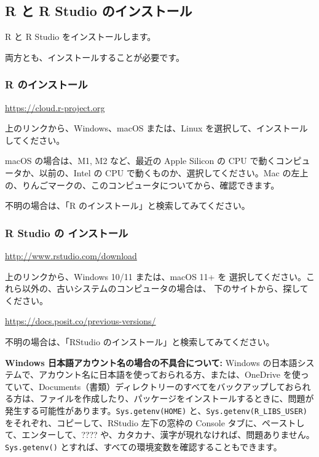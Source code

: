 \documentclass[
]{bxjsbook}
\theoremstyle{definition}
\theoremstyle{definition}
\theoremstyle{definition}
\theoremstyle{definition}
\theoremstyle{remark}
\begin{document}
\hypertarget{r-ux3068-r-studio-ux306eux30a4ux30f3ux30b9ux30c8ux30fcux30eb}{%
\subsection{R と R Studio のインストール}\label{r-ux3068-r-studio-ux306eux30a4ux30f3ux30b9ux30c8ux30fcux30eb}}

R と R Studio をインストールします。

両方とも、インストールすることが必要です。

\hypertarget{r-ux306eux30a4ux30f3ux30b9ux30c8ux30fcux30eb}{%
\subsubsection{R のインストール}\label{r-ux306eux30a4ux30f3ux30b9ux30c8ux30fcux30eb}}

\url{https://cloud.r-project.org}

上のリンクから、Windows、macOS または、Linux を選択して、インストールしてください。

macOS の場合は、M1, M2 など、最近の Apple Silicon の CPU で動くコンピュータか、以前の、Intel の CPU で動くものか、選択してください。Mac の左上の、りんごマークの、このコンピュータについてから、確認できます。

不明の場合は、「R のインストール」と検索してみてください。

\hypertarget{r-studio-ux306e-ux30a4ux30f3ux30b9ux30c8ux30fcux30eb}{%
\subsubsection{R Studio の インストール}\label{r-studio-ux306e-ux30a4ux30f3ux30b9ux30c8ux30fcux30eb}}

\url{http://www.rstudio.com/download}

上のリンクから、Windows 10/11 または、macOS 11+ を 選択してください。これら以外の、古いシステムのコンピュータの場合は、 下のサイトから、探してください。

\url{https://docs.posit.co/previous-versions/}

不明の場合は、「RStudio のインストール」と検索してみてください。

\textbf{Windows 日本語アカウント名の場合の不具合について:}
Windows の日本語システムで、アカウント名に日本語を使っておられる方、または、OneDrive を使っていて、Documents（書類）ディレクトリーのすべてをバックアップしておられる方は、ファイルを作成したり、パッケージをインストールするときに、問題が発生する可能性があります。\texttt{Sys.getenv(\textquotesingle{}HOME\textquotesingle{})} と、\texttt{Sys.getenv(\textquotesingle{}R\_LIBS\_USER\textquotesingle{})} をそれぞれ、コピーして、RStudio 左下の窓枠の Console タブに、ペーストして、エンターして、???? や、カタカナ、漢字が現れなければ、問題ありません。\texttt{Sys.getenv()} とすれば、すべての環境変数を確認することもできます。
\end{document}
